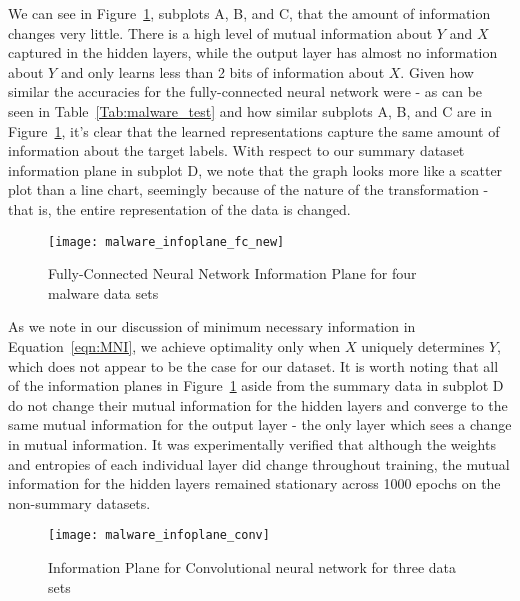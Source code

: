 We can see in Figure~\ref{fig:malware infoplane fc}, subplots A, B, and C, that the amount of information changes very little. There is a high level of mutual information about $Y$ and $X$ captured in the hidden layers, while the output layer has almost no information about $Y$ and only learns less than 2 bits of information about $X$.
Given how similar the accuracies for the fully-connected neural network were - as can be seen in Table~\ref{Tab:malware_test} and how similar subplots A, B, and C are in Figure~\ref{fig:malware infoplane fc}, it's clear that the learned representations capture the same amount of information about the target labels.
With respect to our summary dataset information plane in subplot D, we note that the graph looks more like a scatter plot than a line chart, seemingly because of the nature of the transformation - that is, the entire representation of the data is changed. 

\begin{figure}[h]
\begin{center}
\texttt{[image: malware\_infoplane\_fc\_new]}
\caption{Fully-Connected Neural Network Information Plane for four malware data sets}
\label{fig:malware infoplane fc}
\centering
\end{center}
\end{figure}

As we note in our discussion of minimum necessary information in Equation~\ref{eqn:MNI}, we achieve optimality only when $X$ uniquely determines $Y$, which does not appear to be the case for our dataset. 
It is worth noting that all of the information planes in Figure~\ref{fig:malware infoplane fc} aside from the summary data in subplot D do not change their mutual information for the hidden layers and converge to the same mutual information for the output layer - the only layer which sees a change in mutual information.
It was experimentally verified that although the weights and entropies of each individual layer did change throughout training, the mutual information for the hidden layers remained stationary across 1000 epochs on the non-summary datasets.

\begin{figure}[h!]
\begin{center}
\texttt{[image: malware\_infoplane\_conv]}
\caption{Information Plane for Convolutional neural network for three data sets}
\label{fig:malware infoplane conv}
\centering
\end{center}
\end{figure}

